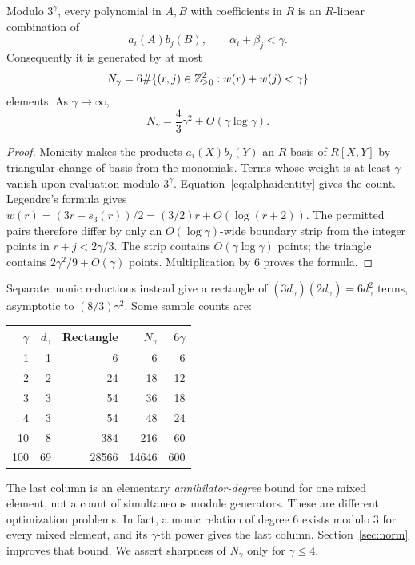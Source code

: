 \begin{theorem}\label{thm:spanning}
Modulo $3^\gamma$, every polynomial in $A,B$ with coefficients in $R$
is an $R$-linear combination of
\[
 a_i(A)b_j(B),\qquad \alpha_i+\beta_j<\gamma.
\]
Consequently it is generated by at most
\begin{equation}\label{eq:Ngamma}
 N_\gamma=6\#\{(r,j)\in\mathbb Z_{\ge0}^2:w(r)+w(j)<\gamma\}
\end{equation}
elements. As $\gamma\to\infty$,
\[
 N_\gamma=\frac43\gamma^2+O(\gamma\log\gamma).
\]
\end{theorem}
\begin{proof}
Monicity makes the products $a_i(X)b_j(Y)$ an $R$-basis of $R[X,Y]$
by triangular change of basis from the monomials. Terms whose weight
is at least $\gamma$ vanish upon evaluation modulo $3^\gamma$.
Equation~\eqref{eq:alphaidentity} gives the count.
Legendre's formula gives $w(r)=(3r-s_3(r))/2=(3/2)r+O(\log(r+2))$.
The permitted pairs therefore differ by only an $O(\log\gamma)$-wide
boundary strip from the integer points in $r+j<2\gamma/3$.
The strip contains $O(\gamma\log\gamma)$ points; the triangle contains
$2\gamma^2/9+O(\gamma)$ points. Multiplication by $6$ proves the formula.
\end{proof}

Separate monic reductions instead give a rectangle of
$(3d_\gamma)(2d_\gamma)=6d_\gamma^2$ terms, asymptotic to
$(8/3)\gamma^2$. Some sample counts are:
\begin{center}
\begin{tabular}{rrrrr}
\toprule
$\gamma$ & $d_\gamma$ & Rectangle & $N_\gamma$ & $6\gamma$\\
\midrule
1&1&6&6&6\\
2&2&24&18&12\\
3&3&54&36&18\\
4&3&54&48&24\\
10&8&384&216&60\\
100&69&28566&14646&600\\
\bottomrule
\end{tabular}
\end{center}
The last column is an elementary \emph{annihilator-degree} bound for
one mixed element, not a count of simultaneous module generators.
These are different optimization problems. In fact, a monic relation
of degree $6$ exists modulo $3$ for every mixed element, and its
$\gamma$-th power gives the last column. Section~\ref{sec:norm} improves
that bound. We assert sharpness of $N_\gamma$ only for $\gamma\le4$.

